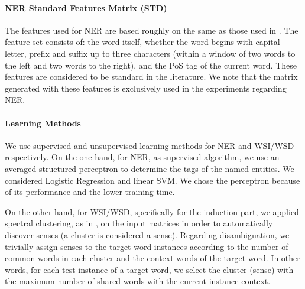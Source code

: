\paragraph{NER Standard Features Matrix (STD)}
The features used for NER are based roughly on the same as those used in \cite{Daume2006,Balasuriya2009}. The feature set consists of: the word itself, whether the word begins with capital letter, prefix and suffix up to three characters (within a window of two words to the left and two words to the right), and the PoS tag of the current word. These features are considered to be standard in the literature. We note that the matrix generated with these features is exclusively used in the experiments regarding NER.	

\paragraph{Learning Methods}
We use supervised and unsupervised learning methods for NER and WSI/WSD respectively. On the one hand, for NER, as supervised algorithm, we use an averaged structured perceptron \cite{Collins2002,Daume2006} to determine the tags of the named entities. We considered Logistic Regression and linear SVM. We chose the perceptron because of its performance and the lower training time.

On the other hand, for WSI/WSD, specifically for the induction part, we applied spectral clustering, as in  \cite{GoyalH14}, on the input matrices in order to automatically discover senses (a cluster is considered a sense). Regarding disambiguation, we trivially assign senses to the target word instances according to the number of common words in each cluster and the context words of the target word. In other words, for each test instance of a target word, we select the cluster (sense) with the maximum number of shared words with the current instance context.






